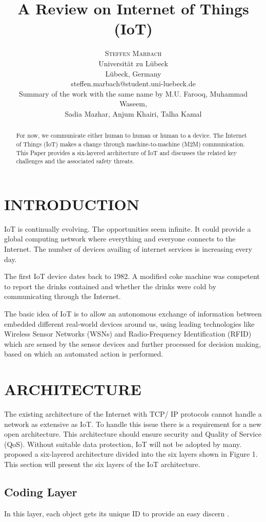 \documentclass[twoside,twocolumn]{article}
\title{\textbf{A Review on Internet of Things (IoT)}}
\author{
    \textsc{Steffen Marbach} \\[0.5ex]
    \normalsize Universität zu Lübeck \\
    \normalsize Lübeck, Germany \\
    \normalsize steffen.marbach@student.uni-luebeck.de \\[1.5ex]
    \normalsize Summary of the work with the same name by M.U. Farooq, Muhammad Waseem, \\
    \normalsize Sadia Mazhar, Anjum Khairi, Talha Kamal \cite{AReViewOnInternetOfThings}
}
\date{}
\begin{document}
\maketitle

\begin{abstract}
   \noindent For now, we communicate either human to human or human to a device. The Internet of Things (IoT) makes a change through machine-to-machine (M2M) communication. This Paper provides a six-layered architecture of IoT and discusses the related key challenges and the associated safety threats.
\end{abstract}

\section{INTRODUCTION}
    \noindent IoT is continually evolving. The opportunities seem infinite. It could provide a global computing network where everything and everyone connects to the Internet. The number of devices availing of internet services is increasing every day.
    
    The first IoT device dates back to 1982. A modified coke machine was competent to report the drinks contained and whether the drinks were cold by communicating through the Internet\cite{CokeMachine}.
    
    The basic idea of IoT is to allow an autonomous exchange of information between embedded different real-world devices around us, using leading technologies like Wireless Sensor Networks (WSNs) and Radio-Frequency Identification (RFID) which are sensed by the sensor devices and further processed for decision making, based on which an automated action is performed.
    
\section{ARCHITECTURE}
    \noindent The existing architecture of the Internet with TCP/ IP protocols cannot handle a network as extensive as IoT. To handle this issue there is a requirement for a new open architecture. This architecture should ensure security and Quality of Service (QoS). Without suitable data protection, IoT will not be adopted by many. \cite{ArchitectureIoT} proposed a six-layered architecture divided into the six layers shown in Figure 1. This section will present the six layers of the IoT architecture.
    \subsection{Coding Layer}
        \noindent In this layer, each object gets its unique ID to provide an easy discern \cite{ArchitectureIoT}.        
\end{document}
